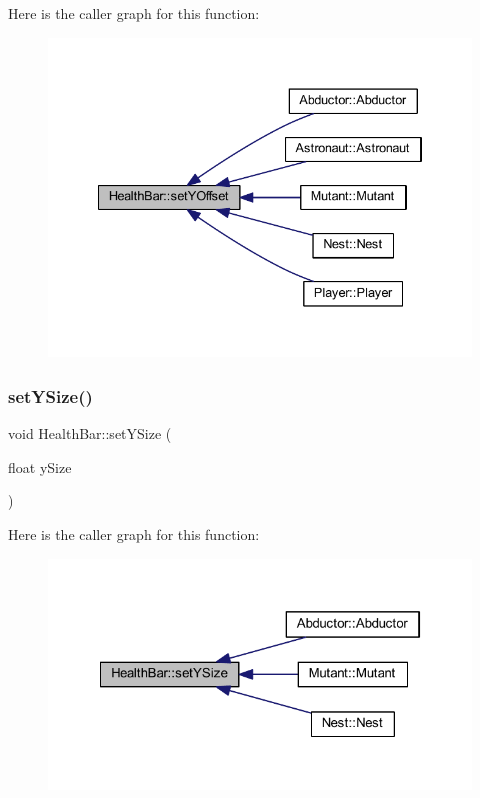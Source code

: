 Here is the caller graph for this function\+:
\nopagebreak
\begin{figure}[H]
\begin{center}
\leavevmode
\includegraphics[width=334pt]{class_health_bar_a625701fd387910d769905ebd1a0f41a4_icgraph}
\end{center}
\end{figure}
\mbox{\label{class_health_bar_aaf0195e315de02546542962e17985126}} 
\subsubsection{\texorpdfstring{set\+Y\+Size()}{setYSize()}}
{\footnotesize\ttfamily void Health\+Bar\+::set\+Y\+Size (\begin{DoxyParamCaption}\item[{float}]{y\+Size }\end{DoxyParamCaption})}

Here is the caller graph for this function\+:
\nopagebreak
\begin{figure}[H]
\begin{center}
\leavevmode
\includegraphics[width=322pt]{class_health_bar_aaf0195e315de02546542962e17985126_icgraph}
\end{center}
\end{figure}
\mbox{\label{class_health_bar_a07c96f51c5742055c496f1dcc5959402}} 
